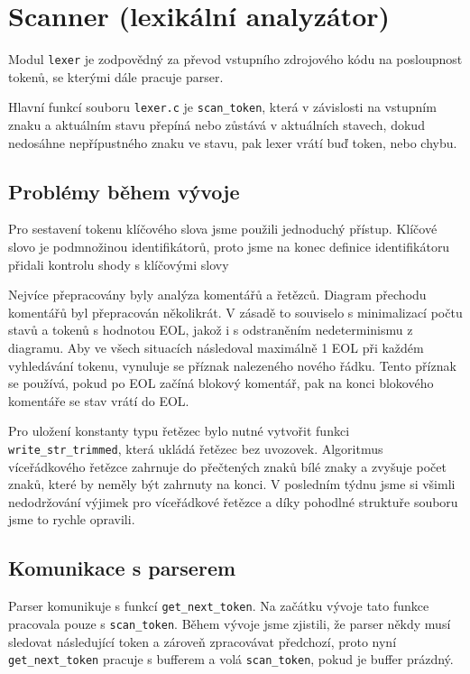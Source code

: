 \section{Scanner (lexikální analyzátor)}

Modul \texttt{lexer} je zodpovědný za převod vstupního zdrojového kódu na posloupnost tokenů, se kterými dále pracuje parser.

Hlavní funkcí souboru \texttt{lexer.c} je \texttt{scan\_token}, která v závislosti na vstupním znaku a aktuálním stavu přepíná nebo zůstává v aktuálních stavech, dokud nedosáhne nepřípustného znaku ve stavu, pak lexer vrátí buď token, nebo chybu.

\subsection*{Problémy během vývoje}

Pro sestavení tokenu klíčového slova jsme použili jednoduchý přístup. Klíčové slovo je podmnožinou identifikátorů, proto jsme na konec definice identifikátoru přidali kontrolu shody s klíčovými slovy

Nejvíce přepracovány byly analýza komentářů a řetězců. Diagram přechodu komentářů byl přepracován několikrát. V zásadě to souviselo s minimalizací počtu stavů a tokenů s hodnotou EOL, jakož i s odstraněním nedeterminismu z diagramu. Aby ve všech situacích následoval maximálně 1 EOL při každém vyhledávání tokenu, vynuluje se příznak nalezeného nového řádku. Tento příznak se používá, pokud po EOL začíná blokový komentář, pak na konci blokového komentáře se stav vrátí do EOL.

Pro uložení konstanty typu řetězec bylo nutné vytvořit funkci \texttt{ write\_str\_trimmed}, která ukládá řetězec bez uvozovek. Algoritmus  víceřádkového řetězce zahrnuje do přečtených znaků bílé znaky a zvyšuje počet znaků, které by neměly být zahrnuty na konci. V posledním týdnu jsme si všimli nedodržování výjimek pro víceřádkové řetězce a díky pohodlné struktuře souboru jsme to rychle opravili.

\subsection*{Komunikace s parserem}

Parser komunikuje s funkcí \texttt{get\_next\_token}. Na začátku vývoje tato funkce pracovala pouze s \texttt{scan\_token}. Během vývoje jsme zjistili, že parser někdy musí sledovat následující token a zároveň zpracovávat předchozí, proto nyní \texttt{get\_next\_token} pracuje s bufferem a volá \texttt{scan\_token}, pokud je buffer prázdný.
